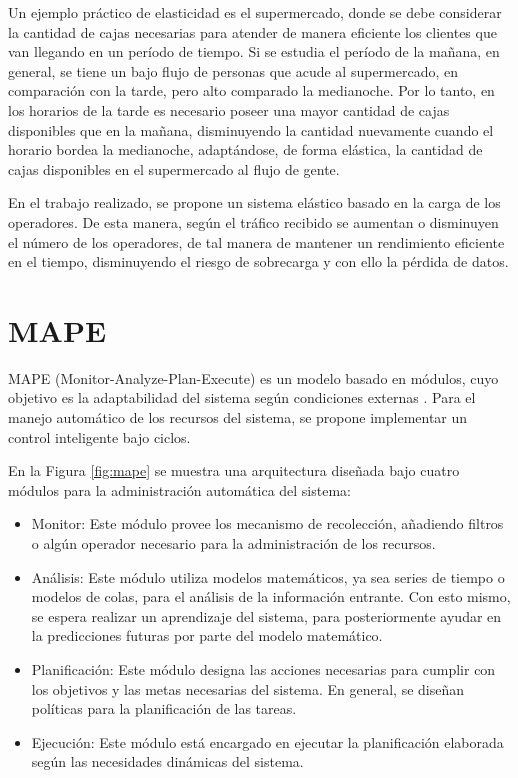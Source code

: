 Un ejemplo pr\'actico de elasticidad es el supermercado, donde se debe considerar la cantidad de cajas necesarias para atender de manera eficiente los clientes que van llegando en un per\'iodo de tiempo. Si se estudia el per\'iodo de la ma\~nana, en general, se tiene un bajo flujo de personas que acude al supermercado, en comparaci\'on con la tarde, pero alto comparado la medianoche. Por lo tanto, en los horarios de la tarde es necesario poseer una mayor cantidad de cajas disponibles que en la ma\~nana, disminuyendo la cantidad nuevamente cuando el horario bordea la medianoche, adapt\'andose, de forma el\'astica, la cantidad de cajas disponibles en el supermercado al flujo de gente.

En el trabajo realizado, se propone un sistema el\'astico basado en la carga de los operadores. De esta manera, seg\'un el tr\'afico recibido se aumentan o disminuyen el n\'umero de los operadores, de tal manera de mantener \normalsize{un rendimiento eficiente} en el tiempo, disminuyendo el riesgo de sobrecarga y con ello la p\'erdida de datos.

\section{MAPE}
\label{sec:MAPE}
\normalsize{MAPE (Monitor-Analyze-Plan-Execute) es un modelo basado en m\'odulos, cuyo objetivo es la adaptabilidad del sistema seg\'un condiciones externas} \citep{ibm2005architectural}. \normalsize{Para el manejo autom\'atico de los recursos del sistema, se propone implementar un control inteligente bajo ciclos.}

\normalsize{En la Figura} \ref{fig:mape} \normalsize{se muestra una arquitectura dise\~nada bajo cuatro m\'odulos para la administraci\'on autom\'atica del sistema:}

\begin{itemize}
	\item \normalsize{Monitor: Este m\'odulo provee los mecanismo de recolecci\'on, a\~nadiendo filtros o alg\'un operador necesario para la administraci\'on de los recursos.}
	\item \normalsize{An\'alisis: Este m\'odulo utiliza modelos matem\'aticos, ya sea series de tiempo o modelos de colas, para el an\'alisis de la informaci\'on entrante. Con esto mismo, se espera realizar un aprendizaje del sistema, para posteriormente ayudar en la predicciones futuras por parte del modelo matem\'atico.}
	\item \normalsize{Planificaci\'on: Este m\'odulo designa las acciones necesarias para cumplir con los objetivos y las metas necesarias del sistema. En general, se dise\~nan pol\'iticas para la planificaci\'on de las tareas.}
	\item \normalsize{Ejecuci\'on: Este m\'odulo est\'a encargado en ejecutar la planificaci\'on elaborada seg\'un las necesidades din\'amicas del sistema.}
\end{itemize}

